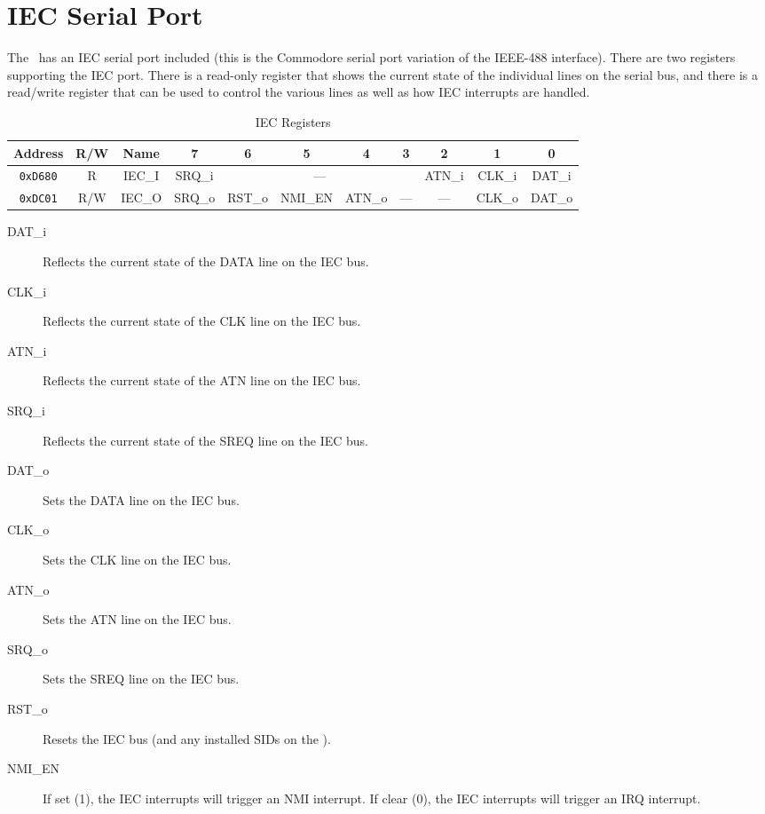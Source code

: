 \chapter{IEC Serial Port}

The \jr\ has an IEC serial port included (this is the Commodore serial port variation of the IEEE-488 interface). There are two registers supporting the IEC port. There is a read-only register that shows the current state of the individual lines on the serial bus, and there is a read/write register that can be used to control the various lines as well as how IEC interrupts are handled.

\begin{table}[h]
    \begin{center}
        \begin{tabular}{|c|c|c|c|c|c|c|c|c|c|c|} \hline
            Address & R/W & Name & 7 & 6 & 5 & 4 & 3 & 2 & 1 & 0 \\\hline\hline
            \verb+0xD680+ & R & IEC\_I & SRQ\_i & \multicolumn{4}{|c|}{---} & ATN\_i & CLK\_i & DAT\_i \\ \hline
            \verb+0xDC01+ & R/W & IEC\_O & SRQ\_o & RST\_o & NMI\_EN & ATN\_o & --- & --- & CLK\_o & DAT\_o \\ \hline
        \end{tabular}
    \end{center}
    \caption{IEC Registers}
    \label{tab:iec_reg}
\end{table}

\begin{description}
    \item[DAT\_i] Reflects the current state of the DATA line on the IEC bus. 
    \item[CLK\_i] Reflects the current state of the CLK line on the IEC bus.
    \item[ATN\_i] Reflects the current state of the ATN line on the IEC bus.
    \item[SRQ\_i] Reflects the current state of the SREQ line on the IEC bus.
    
    \item[DAT\_o] Sets the DATA line on the IEC bus. 
    \item[CLK\_o] Sets the CLK line on the IEC bus.
    \item[ATN\_o] Sets the ATN line on the IEC bus.
    \item[SRQ\_o] Sets the SREQ line on the IEC bus.
    \item[RST\_o] Resets the IEC bus (and any installed SIDs on the \fjr).
    \item[NMI\_EN] If set (1), the IEC interrupts will trigger an NMI interrupt. If clear (0), the IEC interrupts will trigger an IRQ interrupt.  
\end{description}
